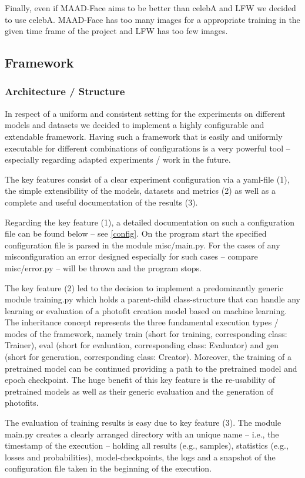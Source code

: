 \documentclass[12pt, a4paper]{article}
\begin{document}
Finally, even if MAAD-Face aims to be better than celebA and LFW we decided to use celebA.
MAAD-Face has too many images for a appropriate training in the given time frame of the project and LFW has too few images.

\subsection{Framework}
\subsubsection{Architecture / Structure}
In respect of a uniform and consistent setting for the experiments on different models and datasets we decided to
implement a highly configurable and extendable framework.
Having such a framework that is easily and uniformly executable for different combinations of configurations is a very
powerful tool -- especially regarding adapted experiments / work in the future.

The key features consist of a clear experiment configuration via a yaml-file (1), the simple extensibility of the models,
datasets and metrics (2) as well as a complete and useful documentation of the results (3).

Regarding the key feature (1), a detailed documentation on such a configuration file can be found below --
see \ref{config}.
On the program start the specified configuration file is parsed in the module misc/main.py.
For the cases of any misconfiguration an error designed especially for such cases -- compare misc/error.py -- will be
thrown and the program stops.

The key feature (2) led to the decision to implement a predominantly generic module training.py which holds a
parent-child class-structure that can handle any learning or evaluation of a photofit creation model based on machine
learning.
The inheritance concept represents the three fundamental execution types / modes of the framework, namely train
(short for training, corresponding class: Trainer), eval (short for evaluation, corresponding class: Evaluator) and gen
(short for generation, corresponding class: Creator).
Moreover, the training of a pretrained model can be continued providing a path to the pretrained model and epoch
checkpoint.
The huge benefit of this key feature is the re-usability of pretrained models as well as their generic evaluation and
the generation of photofits.

The evaluation of training results is easy due to key feature (3).
The module main.py creates a clearly arranged directory with an unique name -- i.e., the timestamp of the execution --
holding all results (e.g., samples), statistics (e.g., losses and probabilities), model-checkpoints, the logs and a
snapshot of the configuration file taken in the beginning of the execution.
\end{document}
